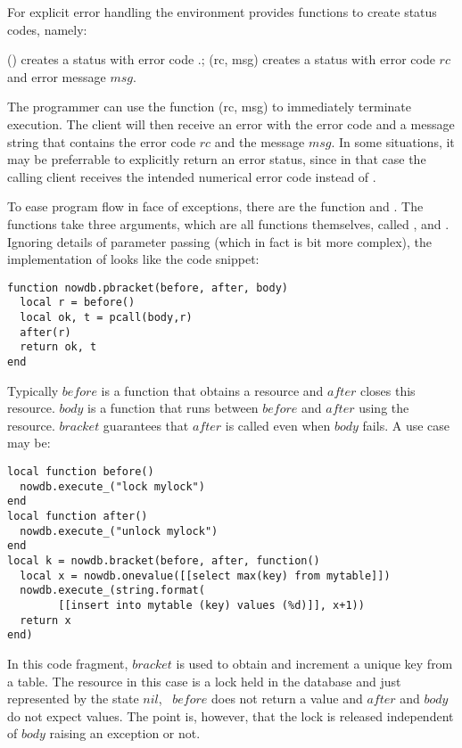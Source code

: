 For explicit error handling
the environment provides functions to
create status codes, namely:

() creates a status with error code
.;
(rc, msg) creates a status with error code $rc$ and
error message $msg$.

The programmer can use the function
(rc, msg) to immediately terminate
execution. The client will then receive an error
with the error code  and a message string
that contains the error code $rc$ and the message $msg$.
In some situations, it may be preferrable
to explicitly return an error status, since in that case
the calling client receives the intended numerical
error code instead of .

To ease program flow in face of exceptions,
there are the function  and
.
The functions take three arguments,
which are all functions themselves, called
,  and .
Ignoring details of parameter passing
(which in fact is bit more complex),
the implementation of  looks
like the code snippet:

\begin{lua}
\begin{lstlisting}
function nowdb.pbracket(before, after, body)
  local r = before()
  local ok, t = pcall(body,r)
  after(r)
  return ok, t
end
\end{lstlisting}
\end{lua}

Typically $before$ is a function that obtains a resource
and $after$ closes this resource. $body$ is a function
that runs between $before$ and $after$ using the resource.
$bracket$ guarantees that $after$ is called
even when $body$ fails. A use case may be:

\begin{lua}
\begin{lstlisting}
local function before() 
  nowdb.execute_("lock mylock")
end
local function after()
  nowdb.execute_("unlock mylock")
end
local k = nowdb.bracket(before, after, function()
  local x = nowdb.onevalue([[select max(key) from mytable]])
  nowdb.execute_(string.format(
        [[insert into mytable (key) values (%d)]], x+1))
  return x
end)
\end{lstlisting}
\end{lua}

In this code fragment, $bracket$ is used to obtain
and increment a unique key from a table.
The resource in this case is a lock held in the database and
just represented by the state $nil$, \ie\
$before$ does not return a value and $after$ and $body$
do not expect values. The point is, however,
that the lock is released independent of $body$
raising an exception or not.

